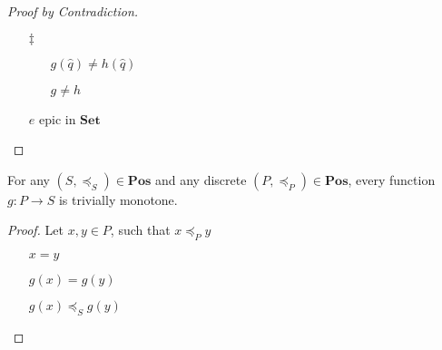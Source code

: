 \begin{lemma}
\begin{proof}[Proof by Contradiction]
\begin{itemize}
      \item[$\ddagger$]
        \begin{itemize}
          \item[\phs]
            $g(\hat{q})\neq h(\hat{q})$

          \item[\imps]
            $g\neq h$
            \marginnote{\Def-$\neq$}
        \end{itemize}

        \item[\contras] $e$ epic in $\mathbf{Set}$
          \qedhere
          \marginnote{\Contra-$\dagger$,~$\ddagger$}
    \end{itemize}
  \end{proof}
\end{lemma}

\begin{lemma}\label{lemma:discrete-poset-monotone}
  For any $(S, \preceq_S)\in\mathbf{Pos}$ and any discrete $(P, \preceq_P)\in\mathbf{Pos}$, every function $g : P \to S$ is trivially monotone.

  \begin{proof}
    Let $x, y\in P$, such that $x\preceq_Py$
    \begin{itemize}
      \item[\imps] $x = y$

      \item[\imps] $g(x) = g(y)$

      \item[\imps] $g(x) \preceq_S g(y)$
        \qedhere
    \end{itemize}

  \end{proof}
\end{lemma}

